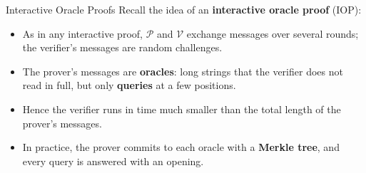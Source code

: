 \documentclass{zkdl-presentation-template}
\begin{document}
    \begin{frame}{Interactive Oracle Proofs}
        Recall the idea of an \textbf{interactive oracle proof} (IOP):
        \begin{itemize}
            \item As in any interactive proof, $\mathcal{P}$ and $\mathcal{V}$ exchange messages over several rounds; the verifier's messages are random challenges.\pause
            \item The prover's messages are \textbf{oracles}: long strings that the verifier does not read in full, but only \textbf{queries} at a few positions.\pause
            \item Hence the verifier runs in time much smaller than the total length of the prover's messages.\pause
            \item In practice, the prover commits to each oracle with a \textbf{Merkle tree}, and every query is answered with an opening.
        \end{itemize}
    \end{frame}
\end{document}

